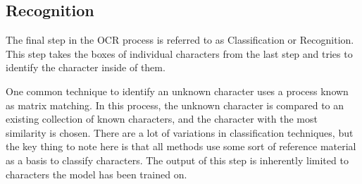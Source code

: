 \documentclass[sigplan,screen,nonacm]{acmart-tagged}
\begin{document}
\subsection{Recognition}
\label{Recognition}
The final step in the OCR process is referred to as Classification or Recognition. This step takes the boxes of individual characters from the last step and tries to identify the character inside of them.


One common technique to identify an unknown character uses a process known as matrix matching. In this process, the unknown character is compared to an existing collection of known characters, and the character with the most similarity is chosen. There are a lot of variations in classification techniques, but the key thing to note here is that all methods use some sort of reference material as a basis to classify characters. The output of this step is inherently limited to characters the model has been trained on.

%

%
%
%
%
\end{document}
